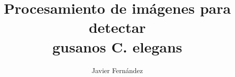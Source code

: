 \documentclass[12pt,letterpaper,oneside,openright]{report}
\title{Procesamiento de im\'agenes para detectar \\
gusanos C. elegans}
\author{Javier Fern\'andez}
\numberwithin{algorithm}{section}
\numberwithin{equation}{section}
\begin{document}
\renewcommand{\tablename}{Tabla}
\renewcommand{\listtablename}{\'Indice de tablas}
\renewcommand{\chaptername}{CAP\'ITULO}




%
%



\setcounter{secnumdepth}{3}
\setcounter{tocdepth}{4}


\addtolength{\headheight}{15pt}
\pagestyle{fancyplain}

\renewcommand{\chaptermark}[1]{\markboth{\chaptername\ \thechapter:\,\ #1}{}}
\renewcommand{\sectionmark}[1]{\markright{\thesection\,\ #1}}


\lhead{}
\chead{}
\rhead{}
\renewcommand{\headrulewidth}{0.5pt}
\lfoot{}
\cfoot{\fancyplain{}{\thepage}}
\rfoot{}


\tableofcontents
\listoftables
\listoffigures

\fancyhf{} %
\lhead{}
\chead{}
\rhead{\fancyplain{}{\thepage}}
\renewcommand{\headrulewidth}{0.5pt}
\lfoot{}
\cfoot{}
\rfoot{}


\setlength{\parindent}{10pt} %








\end{document}
